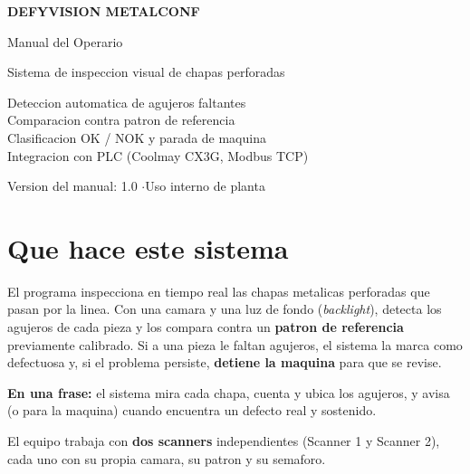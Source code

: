 \documentclass[11pt,a4paper]{article}
\begin{document}
\begin{titlepage}
\centering
\vspace*{2.5cm}
{\Huge\bfseries\color{brandDark} DEFYVISION METALCONF\par}
\vspace{0.6cm}
{\LARGE\color{brand} Manual del Operario\par}
\vspace{0.3cm}
{\large\color{muted} Sistema de inspeccion visual de chapas perforadas\par}
\vspace{2.2cm}
\begin{tcolorbox}[colback=soft,colframe=brand,width=0.8\textwidth,arc=3pt]
\centering\large
Deteccion automatica de agujeros faltantes\\[4pt]
Comparacion contra patron de referencia\\[4pt]
Clasificacion OK / NOK y parada de maquina\\[4pt]
Integracion con PLC (Coolmay CX3G, Modbus TCP)
\end{tcolorbox}
\vfill
{\large\color{muted} Version del manual: 1.0 \quad$\cdot$\quad Uso interno de planta\par}
\vspace{1cm}
\end{titlepage}

\tableofcontents
\newpage

\section{Que hace este sistema}
El programa inspecciona en tiempo real las chapas metalicas perforadas que
pasan por la linea. Con una camara y una luz de fondo (\emph{backlight}),
detecta los agujeros de cada pieza y los compara contra un \textbf{patron de
referencia} previamente calibrado. Si a una pieza le faltan agujeros, el
sistema la marca como defectuosa y, si el problema persiste, \textbf{detiene
la maquina} para que se revise.

\begin{infobox}
\textbf{En una frase:} el sistema mira cada chapa, cuenta y ubica los
agujeros, y avisa (o para la maquina) cuando encuentra un defecto real y
sostenido.
\end{infobox}

El equipo trabaja con \textbf{dos scanners} independientes (Scanner 1 y
Scanner 2), cada uno con su propia camara, su patron y su semaforo.
\end{document}

